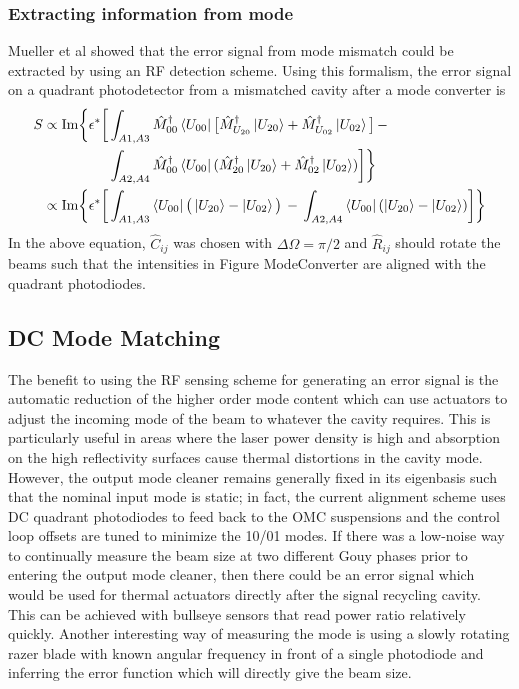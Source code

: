 \subsubsection{Extracting information from mode}
Mueller et al \cite{MuellerMM} showed that the error signal from mode mismatch could be extracted by using an RF detection scheme. Using this formalism, the error signal on a quadrant photodetector from a mismatched cavity after a mode converter is 
	\begin{equation}
	\begin{aligned}
	S 	\propto  \text{Im} \bigg\{ \epsilon^{*} \bigg[&\int_{A1,A3} \hat{M}^{\dagger}_{00} \bra{U_{00}} \big[\hat{M}^{\dagger}_{U_{20}} \ket{U_{20}} + \hat{M}^{\dagger}_{U_{02}} \ket{U_{02}}\big]  \, -\\
	 \, &\int_{A2,A4} \hat{M}^{\dagger}_{00} \bra{U_{00}} (\hat{M}^{\dagger}_{20} \ket{U_{20}} + \hat{M}^{\dagger}_{02} \ket{U_{02}}) \bigg] \bigg\}\\
	\propto \text{Im} \bigg\{ \epsilon^{*} \bigg[&\int_{A1,A3} \bra{U_{00}} \big(\ket{U_{20}} - \ket{U_{02}}\big)  \,-\, \int_{A2,A4}  \bra{U_{00}} ( \ket{U_{20}} - \ket{U_{02}}) \bigg] \bigg\}
	\end{aligned}
	\end{equation}
In the above equation, $\hat{C}_{ij} $ was chosen with $\Delta \Omega = \pi/2$ and $\hat{R}_{ij}$ should rotate the beams such that the intensities in Figure {ModeConverter} are aligned with the quadrant photodiodes.
		
\subsection{DC Mode Matching}
	The benefit to using the RF sensing scheme for generating an error signal is the automatic reduction of the higher order mode content which can use actuators to adjust the incoming mode of the beam to whatever the cavity requires.
	This is particularly useful in areas where the laser power density is high and absorption on the high reflectivity surfaces cause thermal distortions in the cavity mode.
	However, the output mode cleaner remains generally fixed in its eigenbasis such that the nominal input mode is static; in fact, the current alignment scheme uses DC quadrant photodiodes to feed back to the OMC suspensions and the control loop offsets are tuned to minimize the 10/01 modes.
	If there was a low-noise way to continually measure the beam size at two different Gouy phases prior to entering the output mode cleaner, then there could be an error signal which would be used for thermal actuators directly after the signal recycling cavity.
	This can be achieved with bullseye sensors that read power ratio relatively quickly.
	Another interesting way of measuring the mode is using a slowly rotating razer blade with known angular frequency in front of a single photodiode and inferring the error function which will directly give the beam size.
	